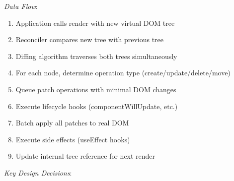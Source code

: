 \documentclass[11pt]{article}
\begin{document}
\emph{Data Flow}:

\begin{enumerate}
\item Application calls render with new virtual DOM tree
\item Reconciler compares new tree with previous tree
\item Diffing algorithm traverses both trees simultaneously
\item For each node, determine operation type (create/update/delete/move)
\item Queue patch operations with minimal DOM changes
\item Execute lifecycle hooks (componentWillUpdate, etc.)
\item Batch apply all patches to real DOM
\item Execute side effects (useEffect hooks)
\item Update internal tree reference for next render
\end{enumerate}

\emph{Key Design Decisions}:
\end{document}

